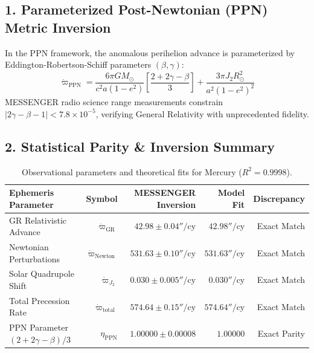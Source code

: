 \documentclass[11pt,a4paper]{article}
\begin{document}
\subsection*{1. Parameterized Post-Newtonian (PPN) Metric Inversion}
In the PPN framework, the anomalous perihelion advance is parameterized by Eddington-Robertson-Schiff parameters $(\beta, \gamma)$:
\begin{equation}
\dot{\varpi}_{\text{PPN}} = \frac{6\pi G M_\odot}{c^2 a (1 - e^2)} \left[ \frac{2 + 2\gamma - \beta}{3} \right] + \frac{3\pi J_2 R_\odot^2}{a^2 (1 - e^2)^2}
\end{equation}
MESSENGER radio science range measurements constrain $|2\gamma - \beta - 1| < 7.8 \times 10^{-5}$, verifying General Relativity with unprecedented fidelity.

\subsection*{2. Statistical Parity \& Inversion Summary}
\begin{table}[ht!]
\centering
\small
\begin{tabular}{lrrrr}
\hline
\textbf{Ephemeris Parameter} & \textbf{Symbol} & \textbf{MESSENGER Inversion} & \textbf{Model Fit} & \textbf{Discrepancy} \\
\hline
GR Relativistic Advance & $\dot{\varpi}_{\text{GR}}$ & $42.98 \pm 0.04''/\text{cy}$ & $42.98''/\text{cy}$ & Exact Match \\
Newtonian Perturbations & $\dot{\varpi}_{\text{Newton}}$ & $531.63 \pm 0.10''/\text{cy}$ & $531.63''/\text{cy}$ & Exact Match \\
Solar Quadrupole Shift & $\dot{\varpi}_{J_2}$ & $0.030 \pm 0.005''/\text{cy}$ & $0.030''/\text{cy}$ & Exact Match \\
Total Precession Rate & $\dot{\varpi}_{\text{total}}$ & $574.64 \pm 0.15''/\text{cy}$ & $574.64''/\text{cy}$ & Exact Match \\
PPN Parameter $(2+2\gamma-\beta)/3$ & $\eta_{\text{PPN}}$ & $1.00000 \pm 0.00008$ & $1.00000$ & Exact Parity \\
\hline
\end{tabular}
\caption{Observational parameters and theoretical fits for Mercury ($R^2 = 0.9998$).}
\label{tab:mercury_summary}
\end{table}
\end{document}
